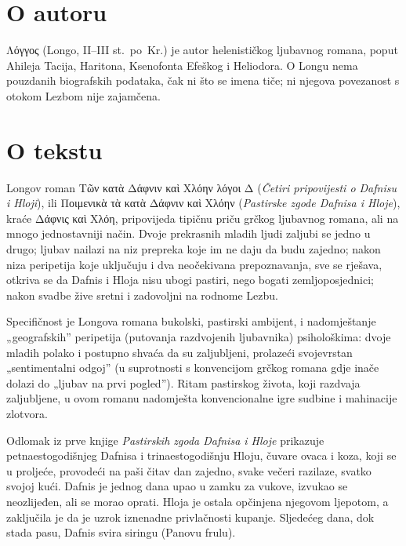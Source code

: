 \section*{O autoru}

Λόγγος (Longo, II–III st.\ po~Kr.) je autor helenističkog ljubavnog romana, poput Ahileja Tacija, Haritona, Ksenofonta Efeškog i Heliodora. O Longu nema pouzdanih biografskih podataka, čak ni što se imena tiče; ni njegova povezanost s otokom Lezbom nije zajamčena.

\section*{O tekstu}

Longov roman \textgreek{Τῶν κατὰ Δάφνιν καὶ Χλόην λόγοι Δ} (\textit{Četiri pripovijesti o Dafnisu i Hloji}), ili \textgreek{Ποιμενικὰ τὰ κατὰ Δάφνιν καὶ Χλόην} (\textit{Pastirske zgode Dafnisa i Hloje}), kraće \textgreek{Δάφνις καὶ Χλόη,} pripovijeda tipičnu priču grčkog ljubavnog romana, ali na mnogo jednostavniji način. Dvoje prekrasnih mladih ljudi zaljubi se jedno u drugo; ljubav nailazi na niz prepreka koje im ne daju da budu zajedno; nakon niza peripetija koje uključuju i dva neočekivana prepoznavanja, sve se rješava, otkriva se da Dafnis i Hloja nisu ubogi pastiri, nego bogati zemljoposjednici; nakon svadbe žive sretni i zadovoljni na rodnome Lezbu.

Specifičnost je Longova romana bukolski, pastirski ambijent, i nadomještanje „geografskih'' peripetija (putovanja razdvojenih ljubavnika) psihološkima: dvoje mladih polako i postupno shvaća da su zaljubljeni, prolazeći svojevrstan „sentimentalni odgoj'' (u suprotnosti s konvencijom grčkog romana gdje inače dolazi do „ljubav na prvi pogled''). Ritam pastirskog života, koji razdvaja zaljubljene, u ovom romanu nadomješta konvencionalne igre sudbine i mahinacije zlotvora.

Odlomak iz prve knjige \textit{Pastirskih zgoda Dafnisa i Hloje} prikazuje petnaestogodišnjeg Dafnisa i trinaestogodišnju Hloju, čuvare ovaca i koza, koji se u proljeće, provodeći na paši čitav dan zajedno, svake večeri razilaze, svatko svojoj kući. Dafnis je jednog dana upao u zamku za vukove, izvukao se neozlijeđen, ali se morao oprati. Hloja je ostala opčinjena njegovom ljepotom, a zaključila je da je uzrok iznenadne privlačnosti kupanje. Sljedećeg dana, dok stada pasu, Dafnis svira siringu (Panovu frulu).


